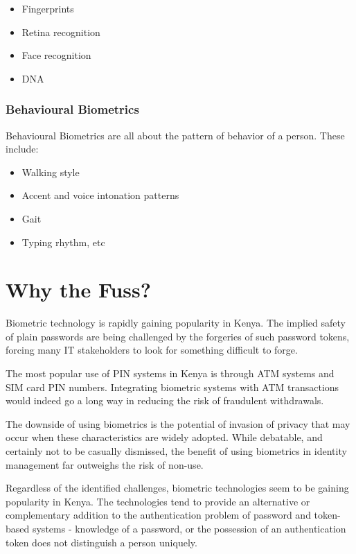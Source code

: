 \documentclass[12pt]{report}
\begin{document}
\begin{itemize}
\item Fingerprints
\item Retina recognition
\item Face recognition
\item DNA
\end{itemize}

\subsection{Behavioural Biometrics}

Behavioural Biometrics are all about the pattern of behavior of a person. These include:

\begin{itemize}
\item Walking style
\item Accent and voice intonation patterns
\item Gait
\item Typing rhythm, etc
\end{itemize}

\chapter{Why the Fuss?}

Biometric technology is rapidly gaining popularity in Kenya. The implied safety of plain passwords are being challenged by the forgeries of such password tokens, forcing many IT stakeholders to look for something difficult to forge. 

The most popular use of PIN systems in Kenya is through ATM systems and SIM card PIN numbers. Integrating biometric systems with ATM transactions would indeed go a long way in reducing the risk of fraudulent withdrawals. 

The downside of using biometrics is the potential of invasion of privacy that may occur when these characteristics are widely adopted. While debatable, and certainly not to be casually dismissed, the benefit of using biometrics in identity management far outweighs the risk of non-use. 

Regardless of the identified challenges, biometric technologies seem to be gaining popularity in Kenya. The technologies tend to provide an alternative or complementary addition to the authentication problem of password and token-based systems - knowledge of a password, or the possession of an authentication token does not distinguish a person uniquely.
\end{document}
